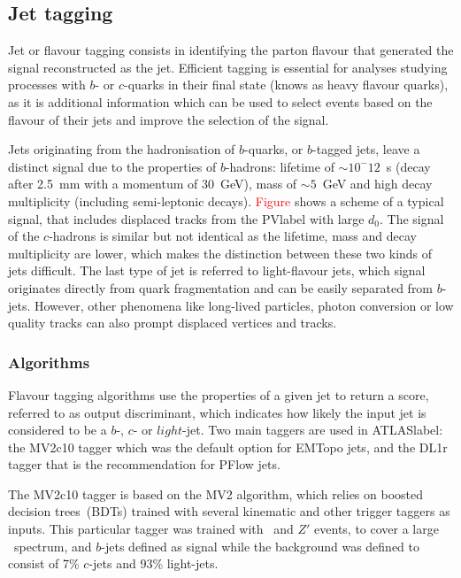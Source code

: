 \subsection{Jet tagging}

Jet or flavour tagging consists in identifying the parton flavour that generated the signal reconstructed as the jet. Efficient tagging is essential for analyses studying processes with $b$- or $c$-quarks in their final state (knows as heavy flavour quarks), as it is additional information which can be used to select events based on the flavour of their jets and improve the selection of the signal.

Jets originating from the hadronisation of $b$-quarks, or $b$-tagged jets, leave a distinct signal due to the properties of $b$-hadrons: lifetime of $\sim 10^-12$~s (decay after 2.5~mm with a momentum of 30~GeV), mass of $\sim 5$~GeV and high decay multiplicity (including semi-leptonic decays). \textcolor{red}{Figure} shows a scheme of a typical signal, that includes displaced tracks from the \acrshort{PVlabel} with large $d_0$.
The signal of the $c$-hadrons is similar but not identical as the lifetime, mass and decay multiplicity are lower, which makes the distinction between these two kinds of jets difficult. The last type of jet is referred to light-flavour jets, which signal originates directly from quark fragmentation and can be easily separated from $b$-jets. However, other phenomena like long-lived particles, photon conversion or low quality tracks can also prompt displaced vertices and tracks.

\subsubsection{Algorithms}

Flavour tagging algorithms use the properties of a given jet to return a score, referred to as output discriminant, which indicates how likely the input jet is considered to be a $b$-, $c$- or $light$-jet. Two main taggers are used in \acrshort{ATLASlabel}: the MV2c10 tagger which was the default option for EMTopo jets, and the DL1r tagger that is the recommendation for PFlow jets.

The MV2c10 tagger  %
is based on the MV2 algorithm, which relies on boosted decision trees~(BDTs) trained with several kinematic and other trigger taggers as inputs. This particular tagger was trained with \ttbar\ and $Z'$ events, to cover a large \pT\ spectrum, and $b$-jets defined as signal while the background was defined to consist of 7\% $c$-jets and 93\% light-jets.

